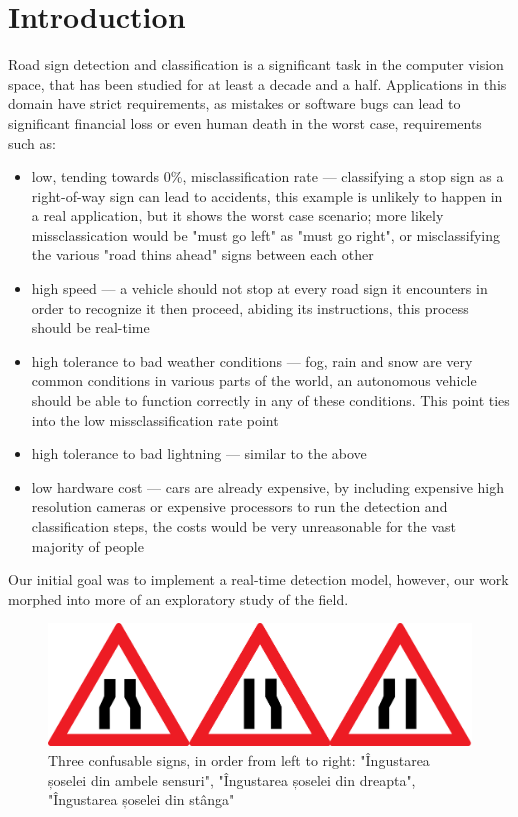 \documentclass[conference]{IEEEtran}
\begin{document}
\section{Introduction}
Road sign detection and classification is a significant task in the computer vision space, that
has been studied for at least a decade and a half. Applications in this domain have strict requirements,
as mistakes or software bugs can lead to significant financial loss or even human death in the worst case,
requirements such as:
\begin{itemize}
    \item low, tending towards 0\%, misclassification rate --- classifying a stop sign as a right-of-way
    sign can lead to accidents, this example is unlikely to happen in a real application, but it shows
    the worst case scenario; more likely missclassication would be "must go left" as "must go right", or
    misclassifying the various "road thins ahead" signs between each other
    \item high speed --- a vehicle should not stop at every road sign it encounters in order to recognize it
    then proceed, abiding its instructions, this process should be real-time
    \item high tolerance to bad weather conditions --- fog, rain and snow are very common conditions in
    various parts of the world, an autonomous vehicle should be able to function correctly in any of these
    conditions. This point ties into the low missclassification rate point
    \item high tolerance to bad lightning --- similar to the above
    \item low hardware cost --- cars are already expensive, by including expensive high resolution cameras
    or expensive processors to run the detection and classification steps, the costs would be very unreasonable
    for the vast majority of people
\end{itemize}

Our initial goal was to implement a real-time detection model, however, our work morphed into more of an
exploratory study of the field.

\begin{figure}
    \centerline{\includegraphics[width=\linewidth]{confusables}}
    \caption{Three confusable signs, in order from left to right: "Îngustarea șoselei din ambele sensuri",
    "Îngustarea șoselei din dreapta", "Îngustarea șoselei din stânga"\protect\footnotemark}
\end{figure}
\end{document}
